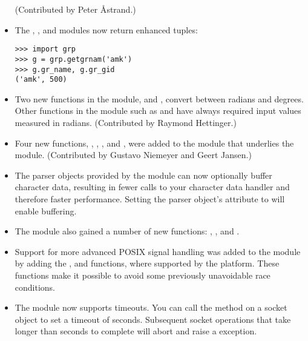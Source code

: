 \documentclass{howto}
\begin{document}
\begin{itemize}
(Contributed by Peter \AA{strand}.)

\item The , , and  modules
now return enhanced tuples: 

\begin{verbatim}
>>> import grp
>>> g = grp.getgrnam('amk')
>>> g.gr_name, g.gr_gid
('amk', 500)
\end{verbatim}


\item Two new functions in the  module, 
 and ,
convert between radians and degrees.  Other functions in the 
 module such as
 and  have always required
input values measured in radians. (Contributed by Raymond Hettinger.)

\item Four new functions, , , , and , were added to the  module that
underlies the  module.  (Contributed by Gustavo Niemeyer
and Geert Jansen.)

\item The parser objects provided by the  module 
can now optionally buffer character data, resulting in fewer calls to
your character data handler and therefore faster performance.  Setting
the parser object's  attribute to  
will enable buffering.

\item The  module also gained a number of new
functions: ,
, and .

\item Support for more advanced POSIX signal handling was added
to the  module by adding the ,
 and  functions, where supported
by the platform.  These functions make it possible to avoid some previously
unavoidable race conditions.

\item The  module now supports timeouts.  You
can call the  method on a socket object to
set a timeout of  seconds.  Subsequent socket operations that
take longer than  seconds to complete will abort and raise a
 exception.  


\end{itemize}
\end{document}
